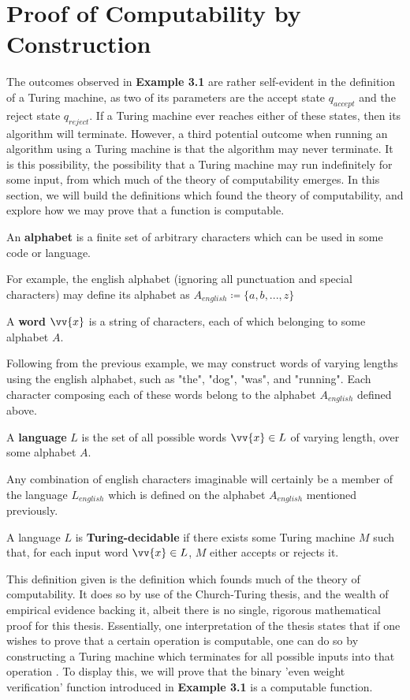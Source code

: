 \documentclass{article}
\begin{document}
\section{Proof of Computability by Construction}
The outcomes observed in \textbf{Example 3.1} are rather self-evident in the definition of a Turing machine, as two of its parameters are the accept state $q_{accept}$ and the reject state $q_{reject}$.  If a Turing machine ever reaches either of these states, then its algorithm will terminate.  However, a third potential outcome when running an algorithm using a Turing machine is that the algorithm may never terminate.  It is this possibility, the possibility that a Turing machine may run indefinitely for some input, from which much of the theory of computability emerges.  In this section, we will build the definitions which found the theory of computability, and explore how we may prove that a function is computable.
\begin{defin}
	An \textbf{alphabet} is a finite set of arbitrary characters which can be used in some code or language.
\end{defin}
\noindent For example, the english alphabet (ignoring all punctuation and special characters) may define its alphabet as $A_{english} \coloneq \{ a, b, ... , z \}$
\begin{defin}
	A \textbf{word} $\vv{x}$ is a string of characters, each of which belonging to some alphabet $A$.
\end{defin}
\noindent Following from the previous example, we may construct words of varying lengths using the english alphabet, such as "the", "dog", "was", and "running".  Each character composing each of these words belong to the alphabet $A_{english}$ defined above.
\begin{defin}
	A \textbf{language} $L$ is the set of all possible words $\vv{x} \in L$ of varying length, over some alphabet $A$.
\end{defin}
\noindent Any combination of english characters imaginable will certainly be a member of the language $L_{english}$ which is defined on the alphabet $A_{english}$ mentioned previously.
\begin{defin}
	A language $L$ is \textbf{Turing-decidable} if there exists some Turing machine $M$ such that, for each input word $\vv{x} \in L$, $M$ either accepts or rejects it. \cite{2}
\end{defin}
\noindent This definition given is the definition which founds much of the theory of computability.  It does so by use of the Church-Turing thesis, and the wealth of empirical evidence backing it, albeit there is no single, rigorous mathematical proof for this thesis.  Essentially, one interpretation of the thesis states that if one wishes to prove that a certain operation is computable, one can do so by constructing a Turing machine which terminates for all possible inputs into that operation \cite{4}.  To display this, we will prove that the binary 'even weight verification' function introduced in \textbf{Example 3.1} is a computable function.
\end{document}
